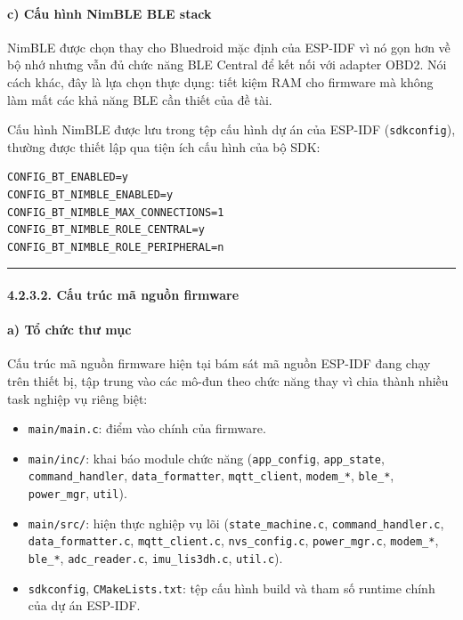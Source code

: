 \documentclass[a4paper]{extarticle}
\providecommand{\tightlist}{%
  \setlength{\itemsep}{0pt}\setlength{\parskip}{0pt}}
\begin{document}
\paragraph{c) Cấu hình NimBLE BLE
stack}\label{c-cux1ea5u-huxecnh-nimble-ble-stack}

NimBLE được chọn thay cho Bluedroid mặc định của ESP-IDF vì nó gọn hơn
về bộ nhớ nhưng vẫn đủ chức năng BLE Central để kết nối với adapter
OBD2. Nói cách khác, đây là lựa chọn thực dụng: tiết kiệm RAM cho
firmware mà không làm mất các khả năng BLE cần thiết của đề tài.

Cấu hình NimBLE được lưu trong tệp cấu hình dự án của ESP-IDF
(\texttt{sdkconfig}), thường được thiết lập qua tiện ích cấu hình của bộ
SDK:

\begin{verbatim}
CONFIG_BT_ENABLED=y
CONFIG_BT_NIMBLE_ENABLED=y
CONFIG_BT_NIMBLE_MAX_CONNECTIONS=1
CONFIG_BT_NIMBLE_ROLE_CENTRAL=y
CONFIG_BT_NIMBLE_ROLE_PERIPHERAL=n
\end{verbatim}

\begin{center}\rule{0.5\linewidth}{0.5pt}\end{center}

\paragraph{4.2.3.2. Cấu trúc mã nguồn
firmware}\label{4232-cux1ea5u-truxfac-muxe3-nguux1ed3n-firmware}

\paragraph{a) Tổ chức thư
mục}\label{a-tux1ed5-chux1ee9c-thux1b0-mux1ee5c}

Cấu trúc mã nguồn firmware hiện tại bám sát mã nguồn ESP-IDF đang chạy
trên thiết bị, tập trung vào các mô-đun theo chức năng thay vì chia
thành nhiều task nghiệp vụ riêng biệt:

\begin{itemize}
\tightlist
\item
  \texttt{main/main.c}: điểm vào chính của firmware.
\item
  \texttt{main/inc/}: khai báo module chức năng
  (\texttt{app\_config}, \texttt{app\_state}, \texttt{command\_handler},
  \texttt{data\_formatter}, \texttt{mqtt\_client}, \texttt{modem\_*},
  \texttt{ble\_*}, \texttt{power\_mgr}, \texttt{util}).
\item
  \texttt{main/src/}: hiện thực nghiệp vụ lõi
  (\texttt{state\_machine.c}, \texttt{command\_handler.c},
  \texttt{data\_formatter.c}, \texttt{mqtt\_client.c},
  \texttt{nvs\_config.c}, \texttt{power\_mgr.c}, \texttt{modem\_*},
  \texttt{ble\_*}, \texttt{adc\_reader.c}, \texttt{imu\_lis3dh.c},
  \texttt{util.c}).
\item
  \texttt{sdkconfig}, \texttt{CMakeLists.txt}: tệp cấu hình build và tham
  số runtime chính của dự án ESP-IDF.
\end{itemize}
\end{document}
